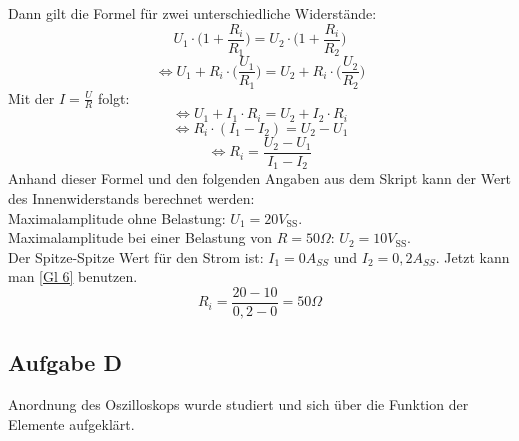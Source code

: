 \documentclass{article}
\begin{document}
Dann gilt die Formel für zwei unterschiedliche Widerstände:
\begin{equation*}
   U_1 \cdot \biggl(1 +\frac{R_i}{R_1}\biggr) = U_2 \cdot \biggl(1 +\frac{R_i}{R_2}\biggr) 
\end{equation*}
\begin{equation*}
    \Leftrightarrow U_1 + R_i \cdot \biggl(\frac{U_1}{R_1}\biggr) = U_2 + R_i \cdot \biggl(\frac{U_2}{R_2}\biggr)
\end{equation*}
Mit der  $I= \frac{U}{R}$ folgt: 
\begin{equation*}
    \Leftrightarrow U_1 +I_1 \cdot R_i =  U_2 +I_2 \cdot R_i
\end{equation*}
\begin{equation*}
    \Leftrightarrow R_i \cdot (I_1-I_2) = U_2 -U_1
\end{equation*}
\begin{equation}
\label{Gl 6}
    \Leftrightarrow R_i = \frac{U_2 - U_1}{I_1 - I_2}
\end{equation}
Anhand dieser Formel und den folgenden Angaben aus dem Skript kann der Wert des Innenwiderstands berechnet werden: \\
Maximalamplitude ohne Belastung: $U_\mathrm{1} = 20V_\mathrm{SS}$. \\
Maximalamplitude bei einer Belastung von $R = 50 \Omega$: $U_\mathrm{2} = 10V_\mathrm{SS}$. \\
Der Spitze-Spitze Wert für den Strom ist: $I_1 = 0A_{SS}$ und $I_2 = 0,2 A_{SS}$. Jetzt kann man \autoref{Gl 6} benutzen.
\begin{equation*}
    R_i = \frac{20-10}{0,2-0} = 50 \Omega
\end{equation*}




\subsection*{Aufgabe D}
Anordnung des Oszilloskops wurde studiert und sich über die Funktion der Elemente aufgeklärt. 
\end{document}
